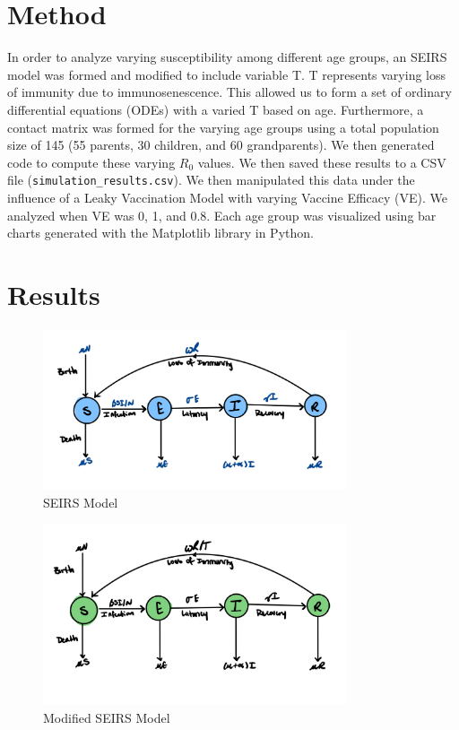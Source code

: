 \documentclass{article}
\begin{document}
\section{Method}
In order to analyze varying susceptibility among different age groups, an SEIRS model was formed and modified to include variable T. T represents varying loss of immunity due to immunosenescence. This allowed us to form a set of ordinary differential equations (ODEs) with a varied T based on age. Furthermore, a contact matrix was formed for the varying age groups using a total population size of 145 (55 parents, 30 children, and 60 grandparents). We then generated code to compute these varying $R_0$ values. We then saved these results to a CSV file (\texttt{simulation\_results.csv}). We then manipulated this data under the influence of a Leaky Vaccination Model with varying Vaccine Efficacy (VE). We analyzed when VE was 0, 1, and 0.8. Each age group was visualized using bar charts generated with the Matplotlib library in Python.

\section{Results}
\begin{figure}[htbp]
    \centering
    \includegraphics[width=0.8\textwidth]{seirs.jpeg}
    \caption{SEIRS Model}
    \label{fig:SEIRS}
\end{figure}

\begin{figure}[htbp]
    \centering
    \includegraphics[width=0.8\textwidth]{seirsM.jpeg}
    \caption{Modified SEIRS Model}
    \label{fig:Immunosenscence Model}
\end{figure}
\end{document}
